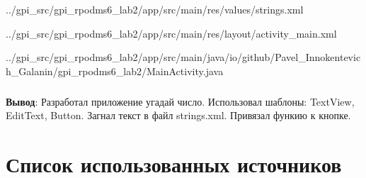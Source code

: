 \documentclass[12pt, a4paper, simple]{eskdtext}
\begin{document}
    
        {../gpi_src/gpi_rpodms6_lab2/app/src/main/res/values/strings.xml}

    
        {../gpi_src/gpi_rpodms6_lab2/app/src/main/res/layout/activity_main.xml}

    
        {../gpi_src/gpi_rpodms6_lab2/app/src/main/java/io/github/Pavel_Innokentevich_Galanin/gpi_rpodms6_lab2/MainActivity.java}

    \subparagraph{} \hspace{0pt}

    \textbf{Вывод}: Разработал приложение угадай число. Использовал шаблоны: TextView, EditText, Button.
    Загнал текст в файл strings.xml. Привязал функию к кнопке.

    \newpage

    \section*{Список использованных источников}
\end{document}

